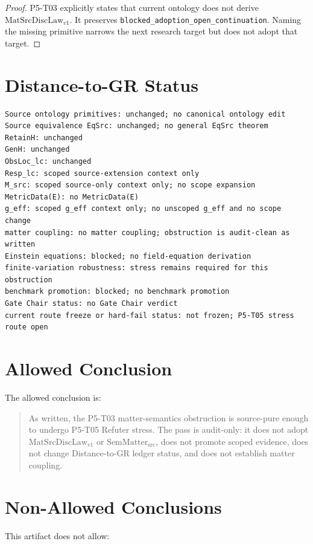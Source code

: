 \documentclass[11pt]{article}
\newcommand{\MatSrcDiscLaw}{\mathrm{MatSrcDiscLaw}_{v1}}
\newcommand{\SemMatterSrc}{\mathrm{SemMatter}_{\mathrm{src}}}
\begin{document}
\begin{proof}
P5-T03 explicitly states that current ontology does not derive
\(\MatSrcDiscLaw\). It preserves
\texttt{blocked\_adoption\_open\_continuation}. Naming the missing primitive
narrows the next research target but does not adopt that target.
\end{proof}

\section{Distance-to-GR Status}

\begin{verbatim}
Source ontology primitives: unchanged; no canonical ontology edit
Source equivalence EqSrc: unchanged; no general EqSrc theorem
RetainH: unchanged
GenH: unchanged
ObsLoc_lc: unchanged
Resp_lc: scoped source-extension context only
M_src: scoped source-only context only; no scope expansion
MetricData(E): no MetricData(E)
g_eff: scoped g_eff context only; no unscoped g_eff and no scope change
matter coupling: no matter coupling; obstruction is audit-clean as written
Einstein equations: blocked; no field-equation derivation
finite-variation robustness: stress remains required for this obstruction
benchmark promotion: blocked; no benchmark promotion
Gate Chair status: no Gate Chair verdict
current route freeze or hard-fail status: not frozen; P5-T05 stress route open
\end{verbatim}

\section{Allowed Conclusion}

The allowed conclusion is:

\begin{quote}
As written, the P5-T03 matter-semantics obstruction is source-pure enough to
undergo P5-T05 Refuter stress. The pass is audit-only: it does not adopt
\(\MatSrcDiscLaw\) or \(\SemMatterSrc\), does not promote scoped evidence,
does not change Distance-to-GR ledger status, and does not establish matter
coupling.
\end{quote}

\section{Non-Allowed Conclusions}

This artifact does not allow:
\end{document}
